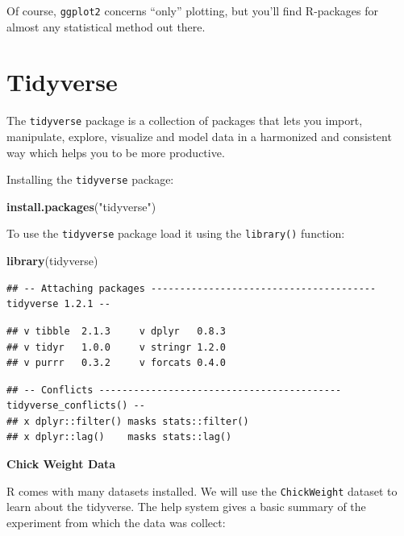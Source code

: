 \documentclass[]{book}
\newenvironment{Shaded}{\begin{snugshade}}{\end{snugshade}}
\newcommand{\KeywordTok}[1]{\textcolor[rgb]{0.13,0.29,0.53}{\textbf{#1}}}
\newcommand{\NormalTok}[1]{#1}
\newcommand{\StringTok}[1]{\textcolor[rgb]{0.31,0.60,0.02}{#1}}
\theoremstyle{definition}
\theoremstyle{definition}
\theoremstyle{definition}
\theoremstyle{remark}
\begin{document}
Of course, \texttt{ggplot2} concerns ``only'' plotting, but you'll find R-packages for almost any statistical method out there.

\hypertarget{tidyverse}{%
\section{Tidyverse}\label{tidyverse}}

The \texttt{tidyverse} package is a collection of packages that lets you import,
manipulate, explore, visualize and model data in a harmonized and consistent way which
helps you to be more productive.

Installing the \texttt{tidyverse} package:

\begin{Shaded}
\begin{Highlighting}[]
\KeywordTok{install.packages}\NormalTok{(}\StringTok{"tidyverse"}\NormalTok{)}
\end{Highlighting}
\end{Shaded}

To use the \texttt{tidyverse} package load it using the \texttt{library()} function:

\begin{Shaded}
\begin{Highlighting}[]
\KeywordTok{library}\NormalTok{(tidyverse)}
\end{Highlighting}
\end{Shaded}

\begin{verbatim}
## -- Attaching packages --------------------------------------- tidyverse 1.2.1 --
\end{verbatim}

\begin{verbatim}
## v tibble  2.1.3     v dplyr   0.8.3
## v tidyr   1.0.0     v stringr 1.2.0
## v purrr   0.3.2     v forcats 0.4.0
\end{verbatim}

\begin{verbatim}
## -- Conflicts ------------------------------------------ tidyverse_conflicts() --
## x dplyr::filter() masks stats::filter()
## x dplyr::lag()    masks stats::lag()
\end{verbatim}

\textbf{Chick Weight Data}

R comes with many datasets installed. We will use the \texttt{ChickWeight} dataset
to learn about the tidyverse. The help system gives a basic summary of the experiment from
which the data was collect:
\end{document}
